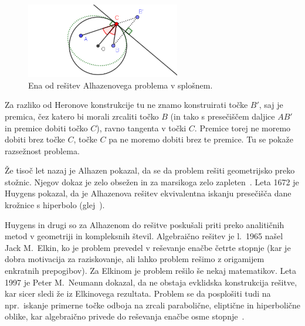 \begin{figure}[h]
    \centering
    \includegraphics[width=0.6\textwidth]{images/alhazen/alhazen1.png}
    \caption[Alhazenov problem]{Ena od rešitev Alhazenovega problema v splošnem.}
    \label{fig:alhazen1}
\end{figure}

Za razliko od Heronove konstrukcije tu ne znamo konstruirati točke $B'$, saj je premica, čez katero bi morali zrcaliti točko $B$ (in tako s presečiščem daljice $AB'$ in premice dobiti točko $C$), ravno tangenta v točki $C$. Premice torej ne moremo dobiti brez točke $C$, točke $C$ pa ne moremo dobiti brez te premice. Tu se pokaže razsežnost problema.

Že tisoč let nazaj je Alhazen pokazal, da se da problem rešiti geometrijsko preko stožnic. Njegov dokaz je zelo obsežen in za marsikoga zelo zapleten~\cite{wilk2015}. Leta 1672 je Huygens pokazal, da je Alhazenova rešitev ekvivalentna iskanju presečišča dane krožnice s hiperbolo (glej~\cite{nishimura2018}).


Huygens in drugi so za Alhazenom do rešitve poskušali priti preko analitičnih metod v geometriji in kompleksnih števil. Algebraično rešitev je l.\ 1965 našel Jack M.\ Elkin, ko je problem prevedel v reševanje enačbe četrte stopnje (kar je dobra motivacija za raziskovanje, ali lahko problem rešimo z origamijem enkratnih prepogibov). Za Elkinom je problem rešilo še nekaj matematikov. Leta 1997 je Peter M.\ Neumann dokazal, da ne obstaja evklidska konstrukcija rešitve, kar sicer sledi že iz Elkinovega rezultata. Problem se da posplošiti tudi na npr.\ iskanje primerne točke odboja na zrcali parabolične, eliptične in hiperbolične oblike, kar algebraično privede do reševanja enačbe osme stopnje~\cite{alhproblemwiki}.

